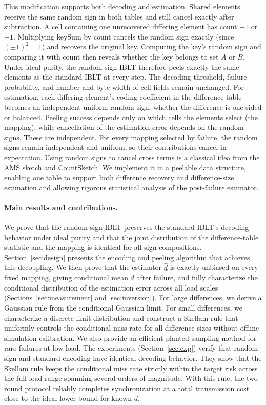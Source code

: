 This modification supports both decoding and estimation. Shared elements receive the same random sign in both tables and still cancel exactly after subtraction. A cell containing one unrecovered differing element has count $+1$ or $-1$. Multiplying keySum by count cancels the random sign exactly (since $(\pm1)^2=1$) and recovers the original key. Computing the key's random sign and comparing it with count then reveals whether the key belongs to set $A$ or $B$. Under ideal purity, the random-sign IBLT therefore peels exactly the same elements as the standard IBLT at every step. The decoding threshold, failure probability, and number and byte width of cell fields remain unchanged. For estimation, each differing element's coding coefficient in the difference table becomes an independent uniform random sign, whether the difference is one-sided or balanced. Peeling success depends only on which cells the elements select (the mapping), while cancellation of the estimation error depends on the random signs. These are independent. For every mapping selected by failure, the random signs remain independent and uniform, so their contributions cancel in expectation. Using random signs to cancel cross terms is a classical idea from the AMS sketch and CountSketch\cite{alon1999spacecomplexity,charikar2004countsketch}. We implement it in a peelable data structure, enabling one table to support both difference recovery and difference-size estimation and allowing rigorous statistical analysis of the post-failure estimator.

\paragraph{Main results and contributions.}
We prove that the random-sign IBLT preserves the standard IBLT's decoding behavior under ideal purity and that the joint distribution of the difference-table statistic and the mapping is identical for all sign compositions. Section~\ref{sec:design} presents the encoding and peeling algorithm that achieves this decoupling. We then prove that the estimator $\widehat d$ is exactly unbiased on every fixed mapping, giving conditional mean $d$ after failure, and fully characterize the conditional distribution of the estimation error across all load scales (Sections~\ref{sec:measurement} and \ref{sec:inversion}). For large differences, we derive a Gaussian rule from the conditional Gaussian limit. For small differences, we characterize a discrete limit distribution and construct a Skellam rule that uniformly controls the conditional miss rate for all difference sizes without offline simulation calibration. We also provide an efficient planted sampling method for rare failures at low load. The experiments (Section~\ref{sec:exp}) verify that random-sign and standard encoding have identical decoding behavior. They show that the Skellam rule keeps the conditional miss rate strictly within the target risk across the full load range spanning several orders of magnitude. With this rule, the two-round protocol reliably completes synchronization at a total transmission cost close to the ideal lower bound for known $d$.

